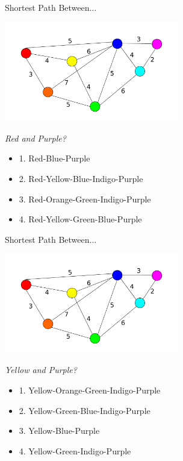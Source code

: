 \documentclass{beamer}
\begin{document}
\begin{frame}{Shortest Path Between...}
	\centerline{\includegraphics[width=3.0in]{weighted.pdf}}
	\textit{Red and Purple?}
        \begin{itemize}
	\item
		\alert{1. Red-Blue-Purple}
	\item
		2. Red-Yellow-Blue-Indigo-Purple
	\item
		3. Red-Orange-Green-Indigo-Purple
	\item
		4. Red-Yellow-Green-Blue-Purple
	\end{itemize}
\end{frame}

\begin{frame}{Shortest Path Between...}
	\centerline{\includegraphics[width=3.0in]{weighted.pdf}}
	\textit{Yellow and Purple?}
        \begin{itemize}
	\item
		1. Yellow-Orange-Green-Indigo-Purple
	\item
		2. Yellow-Green-Blue-Indigo-Purple
	\item
		3. Yellow-Blue-Purple
	\item
		4. Yellow-Green-Indigo-Purple
	\end{itemize}
\end{frame}
\end{document}
